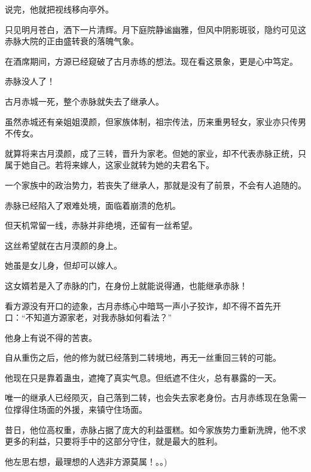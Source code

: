 \begin{this_body}
说完，他就把视线移向亭外。

只见明月苍白，洒下一片清辉。月下庭院静谧幽雅，但风中阴影斑驳，隐约可见这赤脉大院的正由盛转衰的落魄气象。

在酒席期间，方源已经窥破了古月赤练的想法。现在看这景象，更是心中笃定。

赤脉没人了！

古月赤城一死，整个赤脉就失去了继承人。

虽然赤城还有亲姐姐漠颜，但家族体制，祖宗传法，历来重男轻女，家业亦只传男不传女。

就算将来古月漠颜，成了三转，晋升为家老。但她的家业，却不代表赤脉正统，只属于她自己。若将来嫁人，这家业就转为她的夫君名下。

一个家族中的政治势力，若丧失了继承人，那就是没有了前景，不会有人追随的。

赤脉已经陷入了艰难处境，面临着崩溃的危机。

但天机常留一线，赤脉并非绝境，还留有一丝希望。

这丝希望就在古月漠颜的身上。

她虽是女儿身，但却可以嫁人。

这女婿若是入了赤脉的门，在身份上就能说得通，也能继承赤脉！

看方源没有开口的迹象，古月赤练心中暗骂一声小子狡诈，却不得不首先开口：“不知道方源家老，对我赤脉如何看法？”

他身上有说不得的苦衷。

自从重伤之后，他的修为就已经落到二转境地，再无一丝重回三转的可能。

他现在只是靠着蛊虫，遮掩了真实气息。但纸遮不住火，总有暴露的一天。

唯一的继承人已经陨灭，自己落到二转，也会失去家老身份。古月赤练现在急需一位撑得住场面的外援，来镇守住场面。

昔日，他位高权重，赤脉占据了庞大的利益蛋糕。如今家族势力重新洗牌，他不求更多的利益，只要将手中的这部分守住，就是最大的胜利。

他左思右想，最理想的人选非方源莫属！。。)

\end{this_body}

